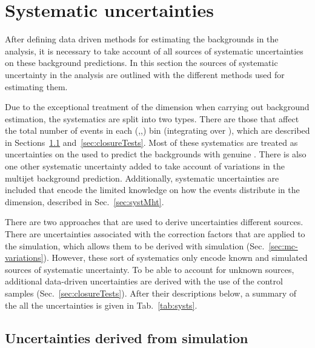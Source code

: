 

\section{Systematic uncertainties} %
\label{sec:systematics}

After defining data driven methods for estimating the \SM backgrounds
in the analysis, it is necessary to take account of all sources of
systematic uncertainties on these background predictions. In this
section the sources of systematic uncertainty in the analysis are
outlined with the different methods used for estimating them.  

Due to the exceptional treatment of the \MHT dimension when carrying
out background estimation, the systematics are split into two types.
There are those that affect the total number of events in each
(\HT,\nj,\nb) bin (integrating over \MHT), which are described in
Sections~\ref{sec:simUnc} and~\ref{sec:closureTests}. Most of these
systematics are treated as uncertainties on the \TFs used to predict
the \SM backgrounds with genuine \MET. There is also one other
systematic uncertainty added to take account of variations in the \QCD
multijet background prediction. Additionally, systematic uncertainties
are included that encode the limited knowledge on how the events
distribute in the \mht dimension, described in Sec.~\ref{sec:systMht}.

There are two approaches that are used to derive uncertainties
different sources. There are uncertainties associated with the
correction factors that are applied to the simulation, which allows
them to be derived with simulation (Sec.~\ref{sec:mc-variations}).
However, these sort of systematics only encode known and simulated
sources of systematic uncertainty. To be able to account for unknown
sources, additional data-driven uncertainties are derived  with the
use of the control samples (Sec.~\ref{sec:closureTests}). After their
descriptions below, a summary of the all the uncertainties is given in
Tab.~\ref{tab:systs}.

\subsection{Uncertainties derived from simulation}
\label{sec:simUnc}

